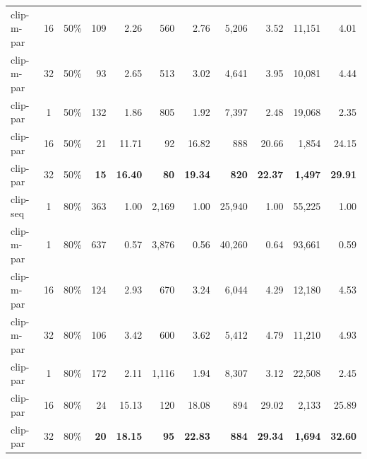 \documentclass{egpubl}
\begin{document}
\begin{table}[t]
\begin{tabular}{lcc@{\quad\quad}rr@{\quad\quad}rr@{\quad\quad}rr@{\quad\quad}rr}
clip-m-par & 16 & 50\% & 109        & 2.26         & 560       & 2.76         & 5,206      & 3.52         & 11,151       & 4.01         \\
clip-m-par & 32 & 50\% & 93         & 2.65         & 513       & 3.02         & 4,641      & 3.95         & 10,081       & 4.44         \\
clip-par   & 1  & 50\% & 132        & 1.86         & 805       & 1.92         & 7,397      & 2.48         & 19,068       & 2.35         \\
clip-par   & 16 & 50\% & 21         & 11.71        & 92        & 16.82        & 888        & 20.66        & 1,854        & 24.15        \\
clip-par   & 32 & 50\% &\textbf{15} &\textbf{16.40}&\textbf{80}&\textbf{19.34}&\textbf{820}&\textbf{22.37}&\textbf{1,497}&\textbf{29.91}\\[1ex]
clip-seq   & 1  & 80\% & 363        & 1.00         & 2,169     & 1.00         & 25,940     & 1.00         & 55,225       & 1.00         \\
clip-m-par & 1  & 80\% & 637        & 0.57         & 3,876     & 0.56         & 40,260     & 0.64         & 93,661       & 0.59         \\
clip-m-par & 16 & 80\% & 124        & 2.93         & 670       & 3.24         & 6,044      & 4.29         & 12,180       & 4.53         \\
clip-m-par & 32 & 80\% & 106        & 3.42         & 600       & 3.62         & 5,412      & 4.79         & 11,210       & 4.93         \\
clip-par   & 1  & 80\% & 172        & 2.11         & 1,116     & 1.94         & 8,307      & 3.12         & 22,508       & 2.45         \\
clip-par   & 16 & 80\% & 24         & 15.13        & 120       & 18.08        & 894        & 29.02        & 2,133        & 25.89        \\
clip-par   & 32 & 80\% &\textbf{20} &\textbf{18.15}&\textbf{95}&\textbf{22.83}&\textbf{884}&\textbf{29.34}&\textbf{1,694}&\textbf{32.60}\\
\bottomrule
\end{tabular}
\end{table}
\end{document}
